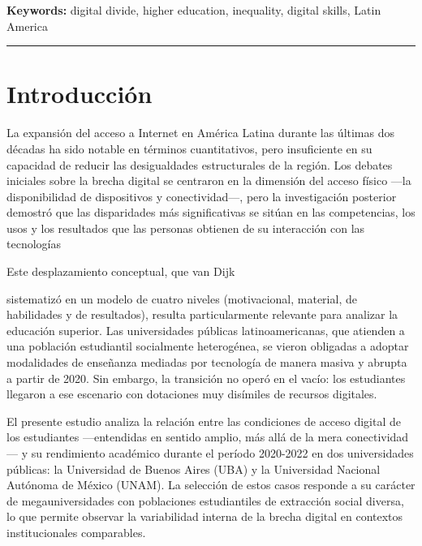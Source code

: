 \begin{tcolorbox}[colback=brown!8!white,colframe=brown!8!white,boxrule=0pt,arc=2pt,left=4pt,right=4pt,top=3pt,bottom=3pt,before skip=4pt,after skip=4pt]
\begin{otherlanguage}{english}
    
\par\smallskip\noindent\textbf{Keywords:} digital divide, higher education, inequality, digital skills, Latin America
\end{otherlanguage}
\end{tcolorbox}

\bigskip
\noindent\rule{\linewidth}{0.4pt}
\bigskip

\section{Introducción}

    
    La expansión del acceso a Internet en América Latina durante las últimas dos décadas ha sido notable en términos cuantitativos, pero insuficiente en su capacidad de reducir las desigualdades estructurales de la región. Los debates iniciales sobre la brecha digital se centraron en la dimensión del acceso físico —la disponibilidad de dispositivos y conectividad—, pero la investigación posterior demostró que las disparidades más significativas se sitúan en las competencias, los usos y los resultados que las personas obtienen de su interacción con las tecnologías 
    
    \autocite{2555-HARGITTAI2002,2552-WARSCHAUER2004}


    
    Este desplazamiento conceptual, que van Dijk 
    
    \autocite{2553-VANDIJK2020}
    
     sistematizó en un modelo de cuatro niveles (motivacional, material, de habilidades y de resultados), resulta particularmente relevante para analizar la educación superior. Las universidades públicas latinoamericanas, que atienden a una población estudiantil socialmente heterogénea, se vieron obligadas a adoptar modalidades de enseñanza mediadas por tecnología de manera masiva y abrupta a partir de 2020. Sin embargo, la transición no operó en el vacío: los estudiantes llegaron a ese escenario con dotaciones muy disímiles de recursos digitales.
   
   


    
    El presente estudio analiza la relación entre las condiciones de acceso digital de los estudiantes —entendidas en sentido amplio, más allá de la mera conectividad— y su rendimiento académico durante el período 2020-2022 en dos universidades públicas: la Universidad de Buenos Aires (UBA) y la Universidad Nacional Autónoma de México (UNAM). La selección de estos casos responde a su carácter de megauniversidades con poblaciones estudiantiles de extracción social diversa, lo que permite observar la variabilidad interna de la brecha digital en contextos institucionales comparables.
   
